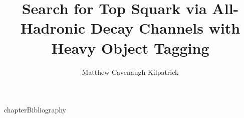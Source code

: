 \documentclass[12pt]{ruthesis}
\title{Search for Top Squark via All-Hadronic Decay Channels with Heavy Object Tagging}
\author{Matthew Cavenaugh Kilpatrick}
\begin{document}
  \begin{frontmatter}
   \maketitle
   
   \tableofcontents
   \listoffigures
   \listoftables
%   
  \end{frontmatter}










\appendix

%
%
%
 {chapter}{\numberline {}Bibliography}{}




\end{document}
